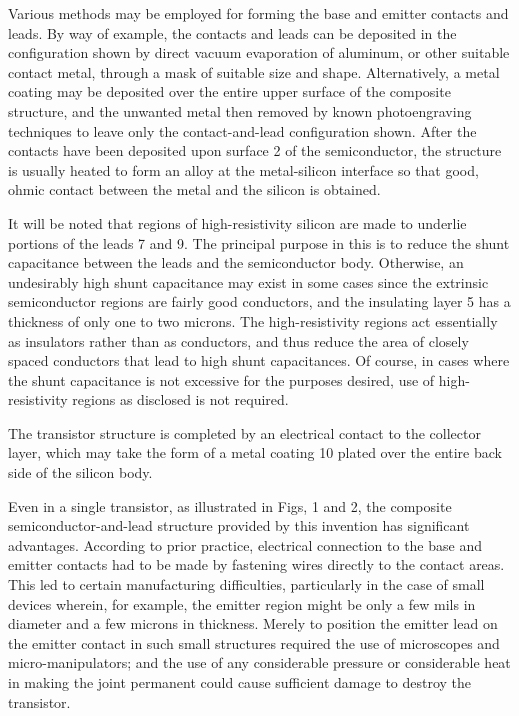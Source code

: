 Various methods may be employed for forming the base and emitter contacts and leads. By way of example, the contacts and leads can be deposited in the configuration shown by direct vacuum evaporation of aluminum, or other suitable contact metal, through a mask of suitable size and shape. Alternatively, a metal coating may be deposited over the entire upper surface of the composite structure, and the unwanted metal then removed by known photoengraving techniques to leave only the contact-and-lead configuration shown. After the contacts have been deposited upon surface 2 of the semiconductor, the structure is usually heated to form an alloy at the metal-silicon interface so that good, ohmic contact between the metal and the silicon is obtained.

It will be noted that regions of high-resistivity silicon are made to underlie portions of the leads 7 and 9. The principal purpose in this is to reduce the shunt capacitance between the leads and the semiconductor body. Otherwise, an undesirably high shunt capacitance may exist in some cases since the extrinsic semiconductor regions are fairly good conductors, and the insulating layer 5 has a thickness of only one to two microns. The high-resistivity regions act essentially as insulators rather than as conductors, and thus reduce the area of closely spaced conductors that lead to high shunt capacitances. Of course, in cases where the shunt capacitance is not excessive for the purposes desired, use of high-resistivity regions as disclosed is not required.

The transistor structure is completed by an electrical contact to the collector layer, which may take the form of a metal coating 10 plated over the entire back side of the silicon body.

Even in a single transistor, as illustrated in Figs, 1 and 2, the composite semiconductor-and-lead structure provided by this invention has significant advantages. According to prior practice, electrical connection to the base and emitter contacts had to be made by fastening wires directly to the contact areas. This led to certain manufacturing difficulties, particularly in the case of small devices wherein, for example, the emitter region might be only a few mils in diameter and a few microns in thickness. Merely to position the emitter lead on the emitter contact in such small structures required the use of microscopes and micro-manipulators; and the use of any considerable pressure or considerable heat in making the joint permanent could cause sufficient damage to destroy the transistor.

